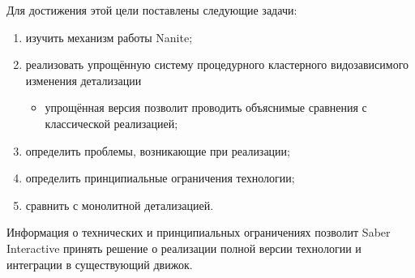 Для достижения этой цели поставлены следующие задачи:
\begin{enumerate}
    \item изучить механизм работы Nanite;
    \item реализовать упрощённую систему процедурного кластерного видозависимого изменения детализации
    \begin{itemize}
        \item упрощённая версия позволит проводить объяснимые сравнения с классической реализацией;
    \end{itemize}
    \item определить проблемы, возникающие при реализации;
    \item определить принципиальные ограничения технологии;
    \item сравнить с монолитной детализацией.
\end{enumerate}

Информация о технических и принципиальных ограничениях позволит Saber Interactive принять решение о реализации полной версии технологии и интеграции в существующий движок.
